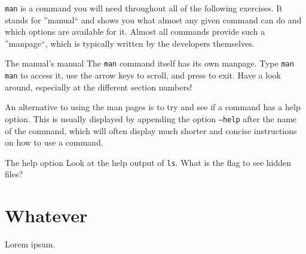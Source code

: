 \documentclass{TheAlternativeCourse}
\begin{document}
\texttt{man} is a command you will need throughout all of the following
exercises.  It stands for ''manual`` and shows you what almost any given
command can do and which options are available for it.  Almost all commands
provide such a ''manpage``, which is typically written by the developers
themselves. \\
%
\begin{exercisebox}{The manual's manual}
    The \texttt{man} command itself has its own manpage. Type \texttt{man man}
    to access it, use the arrow keys to scroll, and press  to exit.
    Have a look around, especially at the different section numbers!
\end{exercisebox}
%
An alternative to using the man pages is to try and see if a command has a help
option. This is usually displayed by appending the option \texttt{--help} after the
name of the command, which will often display much shorter and concise instructions
on how to use a command. \\
%
\begin{exercisebox}{The help option}
    Look at the help output of \texttt{ls}. What is the flag to see hidden files?
\end{exercisebox}

\section{Whatever}

Lorem ipsum.
\end{document}
